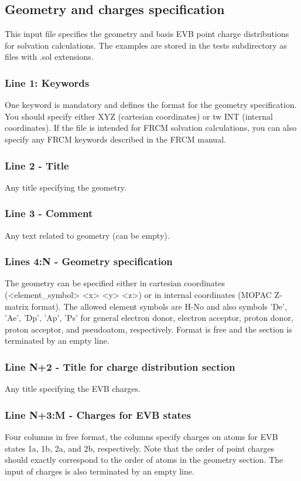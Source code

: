 \documentclass[oneside,11pt,openany]{book}
\newcommand{\tw}{\ttfamily}
\begin{document}
\subsection{Geometry and charges specification}
This input file specifies the geometry and basis EVB point charge
distributions for solvation calculations. The examples are stored
in the {\tw tests} subdirectory as files with
{\tw .sol} extensions.
%
\subsubsection*{Line 1: Keywords}
One keyword is mandatory and defines the format for the geometry
specification. You should specify either {\tw XYZ}
(cartesian coordinates) or {tw INT} (internal coordinates).
If the file is intended for FRCM solvation calculations,
you can also specify any FRCM keywords described in the FRCM
manual.

\subsubsection*{Line 2 - Title}
Any title specifying the geometry.

\subsubsection*{Line 3 - Comment}
Any text related to geometry (can be empty).

\subsubsection*{Lines 4:N - Geometry specification}
The geometry can be specified either in cartesian coordinates
({\tw <element\_symbol>  <x>   <y>   <z>}) or in internal
coordinates ({\tw MOPAC} Z-matrix format). The allowed
element symbols are H-No and also symbols
'De', 'Ae', 'Dp', 'Ap', 'Ps' for general electron donor,
electron acceptor, proton donor, proton acceptor,
and pseudoatom, respectively. Format is free
and the section is terminated by an empty line.

\subsubsection*{Line N+2 - Title for charge distribution section}
Any title specifying the EVB charges.

\subsubsection*{Line N+3:M - Charges for EVB states}
Four columns in free format, the columns specify charges
on atoms for EVB states 1a, 1b, 2a, and 2b, respectively.
Note that the order of point charges should exactly
correspond to the order of atoms in the geometry section.
The input of charges is also terminated by an empty line.
\end{document}
